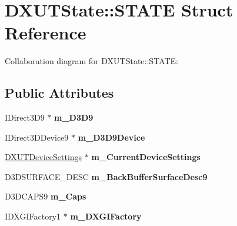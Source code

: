 \hypertarget{struct_d_x_u_t_state_1_1_s_t_a_t_e}{\section{D\+X\+U\+T\+State\+:\+:S\+T\+A\+T\+E Struct Reference}
\label{struct_d_x_u_t_state_1_1_s_t_a_t_e}
}


Collaboration diagram for D\+X\+U\+T\+State\+:\+:S\+T\+A\+T\+E\+:
\subsection*{Public Attributes}
\begin{DoxyCompactItemize}
\item 
\hypertarget{struct_d_x_u_t_state_1_1_s_t_a_t_e_a3e542c366eb22f1457bdf8bb0d6e51f8}{I\+Direct3\+D9 $\ast$ {\bfseries m\+\_\+\+D3\+D9}}\label{struct_d_x_u_t_state_1_1_s_t_a_t_e_a3e542c366eb22f1457bdf8bb0d6e51f8}

\item 
\hypertarget{struct_d_x_u_t_state_1_1_s_t_a_t_e_a5f21418beb1ebf37fd3c0f4b38e92af1}{I\+Direct3\+D\+Device9 $\ast$ {\bfseries m\+\_\+\+D3\+D9\+Device}}\label{struct_d_x_u_t_state_1_1_s_t_a_t_e_a5f21418beb1ebf37fd3c0f4b38e92af1}

\item 
\hypertarget{struct_d_x_u_t_state_1_1_s_t_a_t_e_a7278461ac08aa316f1555203b616b1c5}{\hyperlink{struct_d_x_u_t_device_settings}{D\+X\+U\+T\+Device\+Settings} $\ast$ {\bfseries m\+\_\+\+Current\+Device\+Settings}}\label{struct_d_x_u_t_state_1_1_s_t_a_t_e_a7278461ac08aa316f1555203b616b1c5}

\item 
\hypertarget{struct_d_x_u_t_state_1_1_s_t_a_t_e_ad49ea6ca35f43a4004039b883a6ba25f}{D3\+D\+S\+U\+R\+F\+A\+C\+E\+\_\+\+D\+E\+S\+C {\bfseries m\+\_\+\+Back\+Buffer\+Surface\+Desc9}}\label{struct_d_x_u_t_state_1_1_s_t_a_t_e_ad49ea6ca35f43a4004039b883a6ba25f}

\item 
\hypertarget{struct_d_x_u_t_state_1_1_s_t_a_t_e_a0dfb26596a75b24576af5fcad2f6bfd4}{D3\+D\+C\+A\+P\+S9 {\bfseries m\+\_\+\+Caps}}\label{struct_d_x_u_t_state_1_1_s_t_a_t_e_a0dfb26596a75b24576af5fcad2f6bfd4}

\item 
\hypertarget{struct_d_x_u_t_state_1_1_s_t_a_t_e_a4d492c30c5d6842bbda2d6e112b52e26}{I\+D\+X\+G\+I\+Factory1 $\ast$ {\bfseries m\+\_\+\+D\+X\+G\+I\+Factory}}\label{struct_d_x_u_t_state_1_1_s_t_a_t_e_a4d492c30c5d6842bbda2d6e112b52e26}


\end{DoxyCompactItemize}
